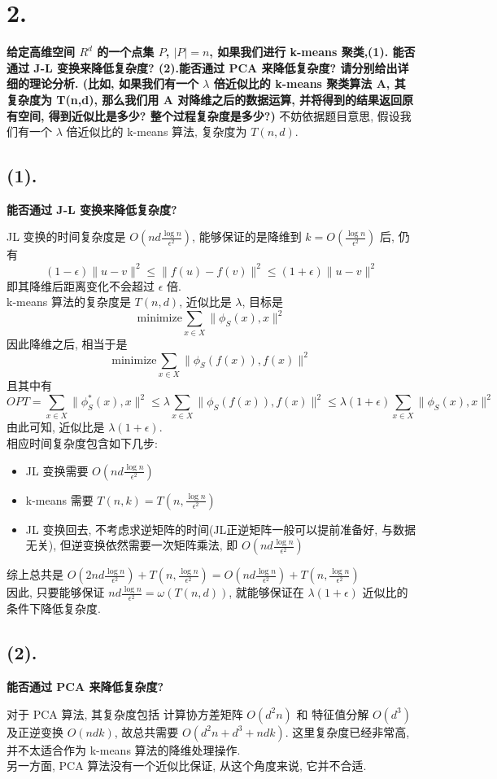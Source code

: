 \documentclass[UTF8]{article}
\newcommand{\jumpLine} {\hspace*{\fill} \par}
\begin{document}
\section*{2.}
\noindent \textbf{给定高维空间 $R^d$ 的一个点集 $P$, $|P|=n$, 如果我们进行 k-means 聚类,(1). 能否通过 J-L 变换来降低复杂度? (2).能否通过 PCA 来降低复杂度? 请分别给出详细的理论分析. (比如, 如果我们有一个 $\lambda$ 倍近似比的 k-means 聚类算法 A, 其复杂度为 T(n,d), 那么我们用 A 对降维之后的数据运算, 并将得到的结果返回原有空间, 得到近似比是多少? 整个过程复杂度是多少?)}
不妨依据题目意思, 假设我们有一个 $\lambda$ 倍近似比的 k-means 算法, 复杂度为 $T(n, d)$.
\subsection*{(1).}
\noindent \textbf{能否通过 J-L 变换来降低复杂度?}
\jumpLine \noindent 
JL 变换的时间复杂度是 $O(nd\frac{\log n}{\epsilon^2})$, 能够保证的是降维到 $k=O(\frac{\log n}{\epsilon^2})$ 后, 仍有
$$(1-\epsilon)\|u-v\|^2\le\|f(u)-f(v)\|^2\le(1+\epsilon)\|u-v\|^2$$
即其降维后距离变化不会超过 $\epsilon$ 倍. \\
k-means 算法的复杂度是 $T(n,d)$, 近似比是 $\lambda$, 目标是
$$\mathrm{minimize} \sum\limits_{x\in X}\|\phi_S(x),x\|^2$$
因此降维之后, 相当于是
$$\mathrm{minimize} \sum\limits_{x\in X}\|\phi_S(f(x)),f(x)\|^2$$
且其中有
$$OPT=\sum\limits_{x\in X}\|\phi_S^*(x),x\|^2
\le
\lambda\sum\limits_{x\in X}\|\phi_S(f(x)),f(x)\|^2
\le
\lambda(1+\epsilon)\sum\limits_{x\in X}\|\phi_S(x),x\|^2$$
由此可知, 近似比是 $\lambda(1+\epsilon)$.\\
相应时间复杂度包含如下几步:
\begin{itemize}
	\item JL 变换需要 $O(nd\frac{\log n}{\epsilon^2})$
	\item k-means 需要 $T(n,k)=T(n,\frac{\log n}{\epsilon^2})$
	\item JL 变换回去, 不考虑求逆矩阵的时间(JL正逆矩阵一般可以提前准备好, 与数据无关), 但逆变换依然需要一次矩阵乘法, 即 $O(nd\frac{\log n}{\epsilon^2})$
\end{itemize}
综上总共是 $O(2nd\frac{\log n}{\epsilon^2}) + T(n,\frac{\log n}{\epsilon^2})=O(nd\frac{\log n}{\epsilon^2}) + T(n,\frac{\log n}{\epsilon^2})$\\
因此, 只要能够保证 $nd\frac{\log n}{\epsilon ^2}=\omega (T(n,d))$, 就能够保证在 $\lambda(1+\epsilon)$ 近似比的条件下降低复杂度.

\subsection*{(2).}
\noindent \textbf{能否通过 PCA 来降低复杂度?}
\jumpLine \noindent 
对于 PCA 算法, 其复杂度包括 计算协方差矩阵 $O(d^2 n)$ 和 特征值分解 $O(d^3)$ 及正逆变换 $O(ndk)$, 故总共需要 $O(d^2n+d^3+ndk)$. 这里复杂度已经非常高, 并不太适合作为 k-means 算法的降维处理操作. \\
另一方面, PCA 算法没有一个近似比保证, 从这个角度来说, 它并不合适.
\end{document}
